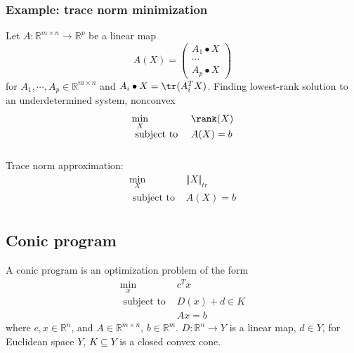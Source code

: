 \documentclass[a4paper]{article}
\begin{document}
{\subsubsection{Example: trace norm minimization}
Let $A: \mathbb{R}^{m \times n} \rightarrow \mathbb{R}^p$ be a linear map
\begin{equation}
  A(X)=\left(\begin{array}{c}
    A_{1} \bullet X \\
    \cdots \\ \nonumber
    A_{p} \bullet X
    \end{array}\right)
\end{equation}
for $A_1, \cdots, A_p \in \mathbb{R}^{m \times n}$ and $A_i \bullet X = \tr(A^T_i X)$. Finding lowest-rank solution to an underdetermined system, nonconvex
\begin{equation}
  \begin{array}{ll}
     \min\limits_{X} & \rank(X) \\
    \text { subject to } & A(X) = b\\ \nonumber
\end{array} 
\end{equation}
Trace norm approximation:
\begin{equation}
  \begin{array}{ll}
     \min\limits_{X} & \Vert X \Vert_{tr} \\
    \text { subject to } & A(X) = b\\ \nonumber
\end{array} 
\end{equation}

\subsection{Conic program}
\begin{defi}
  A conic program is an optimization problem of the form
  \[
  \begin{array}{ll}
      \min\limits_{x} & c^T x \\
      \text { subject to } & D(x) + d \in K \\ \nonumber
      & Ax = b
  \end{array} 
  \]
  where $c, x \in \mathbb{R}^n$, and $A\in \mathbb{R}^{m \times n}$, $b \in \mathbb{R}^m$. $D: \mathbb{R}^n \rightarrow Y$ is a linear map, $d \in Y$, for Euclidean space $Y$, $K \subseteq Y$ is a closed convex cone.
\end{defi}

}
\end{document}
